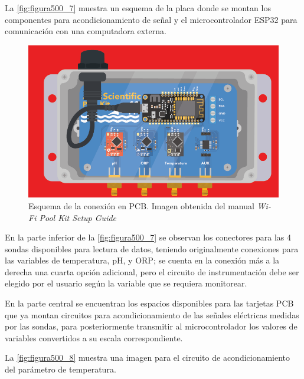 La \autoref{fig:figura500_7} muestra un esquema de la placa donde se montan los componentes para acondicionamiento de señal y el microcontrolador ESP32 para comunicación con una computadora externa.

\begin{figure}[h]
	\centering
	\includegraphics[scale=0.9]{imgss207.png}
	\caption{Esquema de la conexión en PCB. Imagen obtenida del manual \textit{Wi-Fi Pool Kit Setup Guide}}
	\label{fig:figura500_7}
\end{figure}

En la parte inferior de la \autoref{fig:figura500_7} se observan los conectores para las 4 sondas disponibles para lectura de datos, teniendo originalmente conexiones para las variables de temperatura, pH, y ORP; se cuenta 
en la conexión más a la derecha una cuarta opción adicional, pero el circuito de instrumentación debe ser elegido por el usuario según la variable que se requiera monitorear.

En la parte central se encuentran los espacios disponibles para las tarjetas PCB que ya montan circuitos para acondicionamiento de las señales eléctricas medidas por las sondas, para posteriormente transmitir al microcontrolador 
los valores de variables convertidos a su escala correspondiente. 

La \autoref{fig:figura500_8} muestra una imagen para el circuito de acondicionamiento del parámetro de temperatura.

